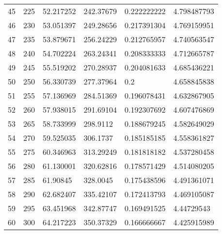 \documentclass[../Matt_Gebert_Honours_Thesis.tex]{subfiles}
\begin{document}
\begin{longtable}[c]{l|lllll}
	45  & 225                     & 52.217252               & 242.37679 & 0.222222222             & 4.798487793            \\
	46  & 230                     & 53.051397               & 249.28656 & 0.217391304             & 4.769159951            \\
	47  & 235                     & 53.879671               & 256.24229 & 0.212765957             & 4.740563547            \\
	48  & 240                     & 54.702224               & 263.24341 & 0.208333333             & 4.712665787            \\
	49  & 245                     & 55.519202               & 270.28937 & 0.204081633             & 4.685436221            \\
	50  & 250                     & 56.330739               & 277.37964 & 0.2                     & 4.658845838            \\
	51  & 255                     & 57.136969               & 284.51369 & 0.196078431             & 4.632867905            \\
	52  & 260                     & 57.938015               & 291.69104 & 0.192307692             & 4.607476869            \\
	53  & 265                     & 58.733999               & 298.9112  & 0.188679245             & 4.582649029            \\
	54  & 270                     & 59.525035               & 306.1737  & 0.185185185             & 4.558361827            \\
	55  & 275                     & 60.346963               & 313.29249 & 0.181818182             & 4.537280458            \\
	56  & 280                     & 61.130001               & 320.62816 & 0.178571429             & 4.514080205            \\
	57  & 285                     & 61.90845                & 328.0045  & 0.175438596             & 4.491361071            \\
	58  & 290                     & 62.682407               & 335.42107 & 0.172413793             & 4.469105087            \\
	59  & 295                     & 63.451968               & 342.87747 & 0.169491525             & 4.44729543             \\
	60  & 300                     & 64.217223               & 350.37329 & 0.166666667             & 4.425915989            \\

\end{longtable}
\end{document}
